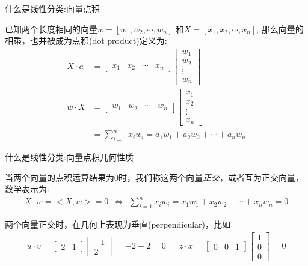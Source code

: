 \documentclass[handout]{beamer}
\begin{document}
\begin{frame}{什么是线性分类:向量点积}
\begin{definition}
	已知两个长度相同的向量$w=[w_1, w_2, \cdots, w_n]$ 和$X = [x_1, x_2, \cdots, x_n]$, 那么向量的相乘，也并被成为点积(dot product)定义为:
\begin{align*}
		 X \cdot a & = \begin{bmatrix}
		x_1 & x_2 & \cdots & x_n
	\end{bmatrix} \begin{bmatrix}
		w_1 \\
		w_2 \\
		\vdots \\
		w_n
	\end{bmatrix} \\
	 w \cdot X & = \begin{bmatrix}
		w_1 & w_2 & \cdots & w_n
	\end{bmatrix} \begin{bmatrix}
		x_1 \\
		x_2 \\
		\vdots \\
		x_n
	\end{bmatrix}\\
	& =  \sum_{i=1}^n x_i w_i = a_1 w_1 + a_2 w_2 + \cdots + a_n w_n 
\end{align*}
\end{definition}
\end{frame}

\begin{frame}{什么是线性分类:向量点积几何性质}
\begin{definition}
	当两个向量的点积运算结果为$0$时，我们称这两个向量\textit{正交}，或者互为正交向量，数学表示为:
	\begin{align*}
		 X \cdot w = <X, w> = 0 \ \ \Leftrightarrow \ \ \sum_{i=1}^n  x_i w_i =  x_1 w_1 +  x_2 w_2 + \cdots +  x_n w_n = 0 
	\end{align*}
\end{definition}

两个向量正交时，在几何上表现为垂直(perpendicular)，比如
\begin{align*}
	u \cdot v = \begin{bmatrix}
		2 & 1 
	\end{bmatrix} \begin{bmatrix}
		-1 \\
		2
	\end{bmatrix} = -2 + 2 = 0 & &  z \cdot x = \begin{bmatrix}
		0 & 0 & 1
	\end{bmatrix} \begin{bmatrix}
		1 \\
		0 \\
		0
	\end{bmatrix} = 0 
\end{align*}		
\end{frame}
\end{document}
